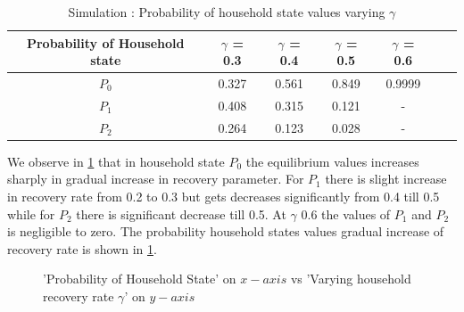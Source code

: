 \documentclass[paper=a4, fontsize=11pt, twoside, BCOR=12mm, parskip=full, listof=totoc]{scrreprt}
\begin{document}
{\begin{table}[H]
	\centering 
	\caption{Simulation : Probability of household state values varying $\gamma$}
	\label{Probability of Household state values with varying gamma}
	\begin{tabular}{ccccccc}
	\toprule
     Probability of Household state & $\gamma$ = 0.3  & $\gamma$ = 0.4 & $\gamma$ = 0.5 & $\gamma$ = 0.6 \\
     \midrule
	 $P_0$ & 0.327  & 0.561  & 0.849 & 0.9999  \\
	 $P_1$ & 0.408  & 0.315  & 0.121 & -\\%
	 $P_2$ & 0.264  & 0.123  & 0.028 & -\\%
	\bottomrule
	\end{tabular}
\end{table}

We observe in \ref{Probability of Household state values with varying gamma} that in household state $P_0$ the equilibrium values increases sharply in gradual increase in recovery parameter. For $P_1$ there is slight increase in recovery rate from 0.2 to 0.3 but gets decreases significantly from 0.4 till 0.5 while for $P_2$ there is significant decrease till 0.5. At $\gamma$ 0.6 the values of $P_1$ and $P_2$ is negligible to zero. The probability household states values gradual increase of recovery rate is shown in \ref{discrete gamma values }.    
\begin{figure}[H]
\centering
{}
\caption{'Probability of Household State' on $x-axis$ vs 'Varying household recovery rate $\gamma$' on $y-axis$ }
\label{discrete gamma values }
\end{figure}

}
\end{document}
